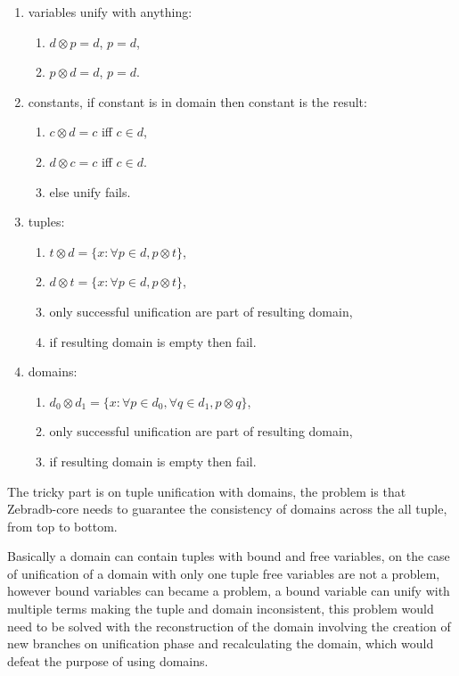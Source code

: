 \documentclass{article}
\begin{document}
\begin{enumerate}
\item variables unify with anything:
    \begin{enumerate}
        \item $d \otimes p = d$, $p=d$,
        \item $p \otimes d = d$, $p=d$.
    \end{enumerate}

\item constants, if constant is in domain then constant is the result:
    \begin{enumerate}
        \item $c \otimes d = c$ iff $c \in d$,
        \item $d \otimes c = c$ iff $c \in d$.
        \item else unify fails.
    \end{enumerate}

\item tuples: 
    \begin{enumerate}
        \item $t \otimes d = \{x: \forall p \in d, p \otimes t \}$,
        \item $d \otimes t = \{x: \forall p \in d, p \otimes t \}$,
        \item only successful unification are part of resulting domain,
        \item if resulting domain is empty then fail.
    \end{enumerate}

\item domains:
    \begin{enumerate}
        \item $d_{0} \otimes d_{1} = \{x: \forall p \in d_{0}, \forall q \in d_{1}, p \otimes q \}$,
        \item only successful unification are part of resulting domain,
        \item if resulting domain is empty then fail.
    \end{enumerate}

\end{enumerate}

The tricky part is on tuple unification with domains, the problem is that Zebradb-core needs to guarantee 
the consistency of domains across the all tuple, from top to bottom.

Basically a domain can contain tuples with bound and free variables, on the case of unification of a domain 
with only one tuple free variables are not a problem, however bound variables can became a problem, a bound 
variable can unify with multiple terms making the tuple and domain inconsistent, this problem would need 
to be solved with the reconstruction of the domain involving the creation of new branches on unification phase
and recalculating the domain, which would defeat the purpose of using domains.
\end{document}
